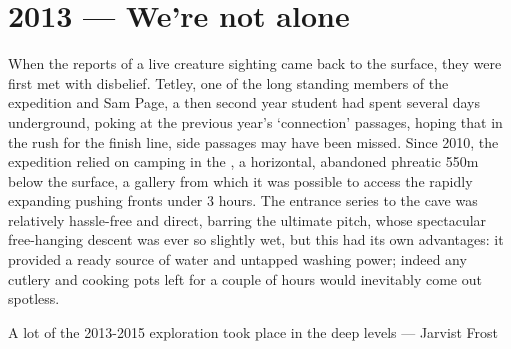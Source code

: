 
\section{2013 --- We’re not alone}

When the reports of a live creature sighting came back to the surface, they were first met with disbelief. Tetley, one of the long standing members of the expedition and Sam Page, a then second year student had spent several days underground, poking at the previous year’s ‘connection’ passages, hoping that in the rush for the finish line, side passages may have been missed. Since 2010, the expedition relied on camping in the , a horizontal, abandoned phreatic 550m below the surface, a gallery from which it was possible to access the rapidly expanding pushing fronts under 3 hours. The entrance series to the cave was relatively hassle-free and direct, barring the ultimate pitch, whose spectacular free-hanging descent was ever so slightly wet, but this had its own advantages: it provided a ready source of water and untapped washing power; indeed any cutlery and cooking pots left for a couple of hours would inevitably come out spotless.

\begin{marginfigure}
	\checkoddpage \ifoddpage \forcerectofloat \else \forceversofloat \fi
	\centering	{} 
  	\caption{A lot of the 2013-2015 exploration took place in the deep \protect{} levels --- Jarvist Frost}
	\end{marginfigure}

